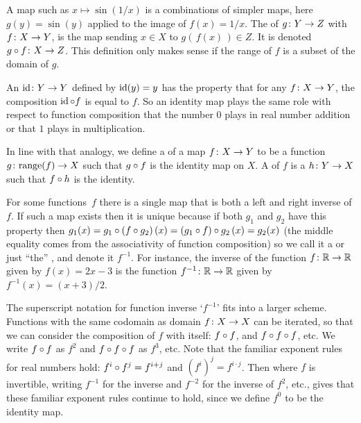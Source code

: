 A map such as \( x\mapsto \sin(1/x) \) is a
combinations of simpler maps, here
\( g(y)=\sin(y) \) applied to the image of \( f(x)=1/x \).
The  
of \( \mbox{$g\colon Y\to Z$} \) with \( \mbox{$f\colon X\to Y$} \),
is the map sending
\( x\in X \) to \( g(\, f(x)\,)\in Z \).
It is denoted \( \mbox{$g\mathbin{\circ} f\colon X\to Z$} \).
This definition only makes sense if the range of \( f \) is a
subset of the domain of \( g \).

An 
\( \mbox{$\operatorname{id}\colon Y\to Y$} \) defined by
\( \operatorname{id}(y)=y \) has the property that for any \( \mbox{$f\colon X\to Y$} \),
the composition \( \operatorname{id}\mathbin{\circ} f \) is equal to \( f \).
So an identity map plays the same role with respect to function composition
that the number \( 0 \) plays in real number addition or that 
\( 1 \) plays in multiplication.

In line with that analogy, we define a
 of a map 
\( \mbox{$f\colon X\to Y$} \) to be a
function \( \mbox{$g\colon \text{range}(f)\to X$} \) such that \( g\mathbin{\circ} f \)
is the identity map on \( X \).
A  of \( f \) is a
\( \mbox{$h\colon Y\to X$} \) such that \( f\mathbin{\circ} h \) is the identity.

For some functions~$f$ there is a single map that is 
both a left and right inverse of \( f \).
If such a map exists then it is unique because if both \( g_1 \) and
\( g_2 \) have this property then
\( g_1(x)=g_1\mathbin{\circ}  (f\mathbin{\circ} g_2)\,(x)
         =(g_1\mathbin{\circ} f) \mathbin{\circ} g_2\,(x)
         =g_2(x) \)
(the middle equality comes from the associativity of function composition)
so we call it a  or just ``the'' 
,
and denote it \( f^{-1} \). 
For instance, the inverse of the function \( \mbox{$f\colon \mathbb{R}\to \mathbb{R}$} \)
given by \( f(x)=2x-3 \) is the function \( \mbox{$f^{-1}\colon \mathbb{R}\to \mathbb{R}$} \)
given by \( f^{-1}(x)=(x+3)/2 \).

The superscript notation for function inverse `\( f^{-1} \)' 
fits into a larger scheme.
Functions with the same codomain as domain $\mbox{$f\colon X\to X$}$ can be iterated,
so that we can consider
the composition of $f$ with itself: \( f\mathbin{\circ} f \), 
and \( f\mathbin{\circ} f\mathbin{\circ} f \), etc.
We 
write $f\mathbin{\circ} f$ as \( f^2 \) and 
$f\mathbin{\circ} f\mathbin{\circ} f$ as \( f^3 \), etc.
Note that the familiar exponent rules for real numbers hold:
\( f^i\mathbin{\circ} f^j=f^{i+j} \) and \( (f^i)^j=f^{i\cdot j} \).
Then where \( f \) is invertible,
writing \( f^{-1} \) for the inverse
and \( f^{-2} \) for the inverse of \( f^2 \), etc., gives that
these familiar exponent rules continue to hold, since we define
\( f^0 \) to be the identity map.

